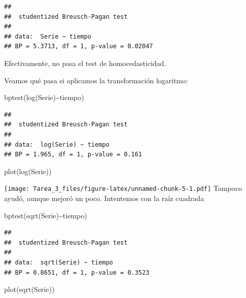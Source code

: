 \documentclass[
]{article}
\newenvironment{Shaded}{\begin{snugshade}}{\end{snugshade}}
\newcommand{\FunctionTok}[1]{\textcolor[rgb]{0.00,0.00,0.00}{#1}}
\newcommand{\NormalTok}[1]{#1}
\newcommand{\SpecialCharTok}[1]{\textcolor[rgb]{0.00,0.00,0.00}{#1}}
\begin{document}
\begin{verbatim}
## 
##  studentized Breusch-Pagan test
## 
## data:  Serie ~ tiempo
## BP = 5.3713, df = 1, p-value = 0.02047
\end{verbatim}

Efectivamente, no pasa el test de homocedasticidad.

Veamos qué pasa si aplicamos la transformación logaritmo:

\begin{Shaded}
\begin{Highlighting}[]
\FunctionTok{bptest}\NormalTok{(}\FunctionTok{log}\NormalTok{(Serie)}\SpecialCharTok{\textasciitilde{}}\NormalTok{tiempo)}
\end{Highlighting}
\end{Shaded}

\begin{verbatim}
## 
##  studentized Breusch-Pagan test
## 
## data:  log(Serie) ~ tiempo
## BP = 1.965, df = 1, p-value = 0.161
\end{verbatim}

\begin{Shaded}
\begin{Highlighting}[]
\FunctionTok{plot}\NormalTok{(}\FunctionTok{log}\NormalTok{(Serie))}
\end{Highlighting}
\end{Shaded}

\texttt{[image: Tarea\_3\_files/figure-latex/unnamed-chunk-5-1.pdf]}
Tampoco ayudó, aunque mejoró un poco. Intentemos con la raíz cuadrada

\begin{Shaded}
\begin{Highlighting}[]
\FunctionTok{bptest}\NormalTok{(}\FunctionTok{sqrt}\NormalTok{(Serie)}\SpecialCharTok{\textasciitilde{}}\NormalTok{tiempo)}
\end{Highlighting}
\end{Shaded}

\begin{verbatim}
## 
##  studentized Breusch-Pagan test
## 
## data:  sqrt(Serie) ~ tiempo
## BP = 0.8651, df = 1, p-value = 0.3523
\end{verbatim}

\begin{Shaded}
\begin{Highlighting}[]
\FunctionTok{plot}\NormalTok{(}\FunctionTok{sqrt}\NormalTok{(Serie))}
\end{Highlighting}
\end{Shaded}
\end{document}
